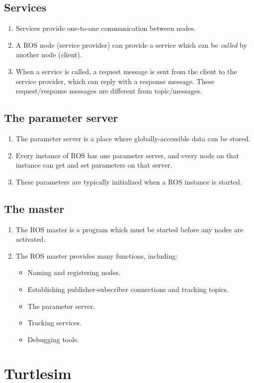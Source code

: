 \documentclass{article}
\begin{document}
        \subsection{Services}
            \begin{enumerate}
                \item Services provide one-to-one communication between nodes.
                \item A ROS node (service provider) can provide a service which can be \emph{called}
                by another node (client).
                \item When a service is called, a request message is sent from the client to the service provider,
                which can reply with a response message. These request/response messages are different from topic/messages. 
            \end{enumerate}
        \subsection{The parameter server}
            \begin{enumerate}
                \item The parameter server is a place where globally-accessible data can be stored.
                \item Every instance of ROS has one parameter server, and every node on that instance can 
                get and set parameters on that server.
                \item These parameters are typically initialized when a ROS instance is started.
            \end{enumerate}
        \subsection{The master}
            \begin{enumerate}
                \item The ROS master is a program which must be started before any nodes are activated.
                \item The ROS master provides many functions, including:
                \begin{itemize}
                    \item Naming and registering nodes.
                    \item Establishing publisher-subscriber connections and tracking topics.
                    \item The parameter server.
                    \item Tracking services.
                    \item Debugging tools.
                \end{itemize}
            \end{enumerate}
    \section{Turtlesim}
        
\end{document}
